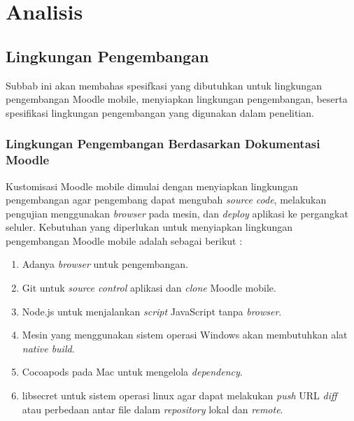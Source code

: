 \chapter{Analisis}
\label{chap:analsa}


\section{Lingkungan Pengembangan}
 Subbab ini akan membahas spesifkasi yang dibutuhkan untuk lingkungan pengembangan Moodle mobile, menyiapkan lingkungan pengembangan, beserta spesifikasi lingkungan pengembangan yang digunakan dalam penelitian.

\subsection{Lingkungan Pengembangan Berdasarkan Dokumentasi Moodle}
Kustomisasi Moodle mobile dimulai dengan menyiapkan lingkungan pengembangan agar pengembang dapat mengubah \textit{source code}, melakukan pengujian menggunakan \textit{browser} pada mesin, dan \textit{deploy} aplikasi ke pergangkat seluler. Kebutuhan yang diperlukan untuk menyiapkan lingkungan pengembangan Moodle mobile adalah sebagai berikut : \cite{moodle:dev}


\begin{enumerate}
	\item Adanya \textit{browser} untuk pengembangan.
	\item Git untuk \textit{source control} aplikasi dan \textit{clone} Moodle mobile.
	\item Node.js untuk menjalankan \textit{script} JavaScript tanpa \textit{browser}.
	\item Mesin yang menggunakan sistem operasi Windows akan membutuhkan alat \textit{native build}.
	\item Cocoapods pada Mac untuk mengelola \textit{dependency}.
	\item libsecret untuk sistem operasi linux agar dapat melakukan \textit{push} URL \textit{diff} atau perbedaan antar file dalam \textit{repository} lokal dan \textit{remote}.
\end{enumerate}


